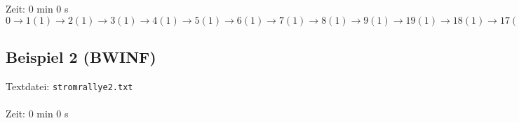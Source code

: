 \documentclass[a4paper,10pt,ngerman]{scrartcl}
\begin{document}
\noindent
Zeit: 0 min 0 s\\

\noindent
$0 \rightarrow1(1) \rightarrow 2(1) \rightarrow 3(1) \rightarrow 4(1) \rightarrow 5(1) \rightarrow 6(1) \rightarrow 7(1) \rightarrow 8(1) 
\rightarrow 9(1) \rightarrow 19(1) \rightarrow 18(1) \rightarrow 17(1) \rightarrow 16(1) \rightarrow 15(1) \rightarrow 14(1) \rightarrow 13(1) 
\rightarrow 12(1) \rightarrow 11(1) \rightarrow 10(1) \rightarrow 20(1) \rightarrow 21(1) \rightarrow 22(1) \rightarrow 23(1) \rightarrow 24(1) 
\rightarrow 25(1) \rightarrow 26(1) \rightarrow 27(1) \rightarrow 28(1) \rightarrow 29(1) \rightarrow 39(1) \rightarrow 38(1) \rightarrow 37(1) 
\rightarrow 36(1) \rightarrow 35(1) \rightarrow 34(1) \rightarrow 33(1) \rightarrow 32(1) \rightarrow 31(1) \rightarrow 30(1) \rightarrow 40(1) 
\rightarrow 41(1) \rightarrow 42(1) \rightarrow 43(1) \rightarrow 44(1) \rightarrow 45(1) \rightarrow 46(1) \rightarrow 47(1) \rightarrow 48(1) 
\rightarrow 49(1) \rightarrow 59(1) \rightarrow 58(1) \rightarrow 57(1) \rightarrow 56(1) \rightarrow 55(1) \rightarrow 54(1) \rightarrow 53(1) 
\rightarrow 52(1) \rightarrow 51(1) \rightarrow 50(1) \rightarrow 60(1) \rightarrow 61(1) \rightarrow 62(1) \rightarrow 63(1) \rightarrow 64(1) 
\rightarrow 65(1) \rightarrow 66(1) \rightarrow 67(1) \rightarrow 68(1) \rightarrow 69(1) \rightarrow 79(1) \rightarrow 78(1) \rightarrow 77(1) 
\rightarrow 76(1) \rightarrow 75(1) \rightarrow 74(1) \rightarrow 73(1) \rightarrow 72(1) \rightarrow 71(1) \rightarrow 70(1) \rightarrow 80(1) 
\rightarrow 81(1) \rightarrow 82(1) \rightarrow 83(1) \rightarrow 84(1) \rightarrow 85(1) \rightarrow 86(1) \rightarrow 87(1) \rightarrow 88(1) 
\rightarrow 89(1) \rightarrow 99(1) \rightarrow 98(1) \rightarrow 97(1) \rightarrow 96(1) \rightarrow 95(1) \rightarrow 94(1) \rightarrow 93(1) 
\rightarrow 92(1) \rightarrow 91(1) \rightarrow 90(1) \rightarrow 80(1) \rightarrow 91(1) 
$

\subsection{Beispiel 2 (BWINF)}\label{example:2}
Textdatei: \texttt{stromrallye2.txt}\\

\noindent
{}\\

\noindent
Zeit: 0 min 0 s\\
\end{document}
